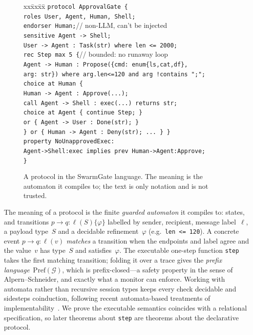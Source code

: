 \documentclass[10pt,twocolumn]{article}
\newcommand{\G}{\mathcal{G}}
\newcommand{\code}[1]{\texttt{\small #1}}
\begin{document}
\begin{figure}[t]
\footnotesize
\begin{tabbing}
xx\=xx\=xx\=\kill
\code{protocol ApprovalGate \{}\\
\>\code{roles User, Agent, Human, Shell;}\\
\>\code{endorser Human;}\quad\textcolor{gn}{\tiny// non-LLM, can't be injected}\\
\>\code{sensitive Agent -> Shell;}\\[0.3ex]
\>\code{User -> Agent : Task(str) where len <= 2000;}\\
\>\code{rec Step max 5 \{}\quad\textcolor{gn}{\tiny// bounded: no runaway loop}\\
\>\>\code{Agent -> Human : Propose(\{cmd: enum\{ls,cat,df\},}\\
\>\>\quad\code{arg: str\}) where arg.len<=120 and arg !contains ";";}\\
\>\>\code{choice at Human \{}\\
\>\>\>\code{Human -> Agent : Approve(...);}\\
\>\>\>\code{call Agent -> Shell : exec(...) returns str;}\\
\>\>\>\code{choice at Agent \{ continue Step; \}}\\
\>\>\>\quad\code{or \{ Agent -> User : Done(str); \} }\\
\>\>\code{\} or \{ Human -> Agent : Deny(str); ... \} \}}\\
\>\code{property NoUnapprovedExec:}\\
\>\quad\code{Agent->Shell:exec implies prev Human->Agent:Approve;}\\
\code{\}}
\end{tabbing}
\vspace{-1.5ex}
\caption{A protocol in the SwarmGate language. The meaning is the automaton it compiles to; the text is
only notation and is not trusted.}
\label{fig:dsl}
\vspace{-1.5ex}
\end{figure}

The meaning of a protocol is the finite \emph{guarded automaton} it compiles to: states, and transitions
\(p \!\to\! q : \ell(S)\{\varphi\}\) labelled by sender, recipient, message label~$\ell$, a payload
type~$S$ and a decidable refinement~$\varphi$ (e.g.\ \code{len <= 120}). A concrete event
\(p \!\to\! q : \ell(v)\) \emph{matches} a transition when the endpoints and label agree and the value~$v$
has type~$S$ and satisfies~$\varphi$. The executable one-step function \code{step} takes the first matching
transition; folding it over a trace gives the \emph{prefix language}~$\mathrm{Pref}(\G)$, which is
prefix-closed---a safety property in the sense of Alpern--Schneider, and exactly what a monitor can enforce.
Working with automata rather than recursive session types keeps every check decidable and sidesteps
coinduction, following recent automata-based treatments of
implementability~\cite{li2023complete,castroperez2026synthetic}. We prove the executable semantics
coincides with a relational specification, so later theorems about \code{step} are theorems about the
declarative protocol.
\end{document}
